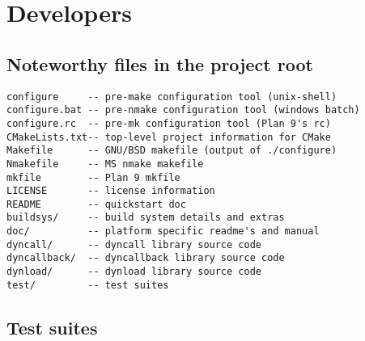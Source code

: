 %
%
%
%

\newpage
\section{Developers}

\subsection{Noteworthy files in the project root}
\begin{verbatim}
configure     -- pre-make configuration tool (unix-shell)
configure.bat -- pre-nmake configuration tool (windows batch)
configure.rc  -- pre-mk configuration tool (Plan 9's rc)
CMakeLists.txt-- top-level project information for CMake
Makefile      -- GNU/BSD makefile (output of ./configure)
Nmakefile     -- MS nmake makefile
mkfile        -- Plan 9 mkfile
LICENSE       -- license information
README        -- quickstart doc
buildsys/     -- build system details and extras
doc/          -- platform specific readme's and manual
dyncall/      -- dyncall library source code
dyncallback/  -- dyncallback library source code
dynload/      -- dynload library source code
test/         -- test suites
\end{verbatim}


\subsection{Test suites}


